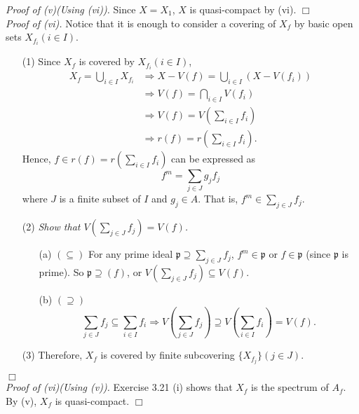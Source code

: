 \documentclass{article}
\begin{document}
\emph{Proof of (v)(Using (vi)).}
Since $X = X_1$, $X$ is quasi-compact by (vi).
$\Box$ \\



\emph{Proof of (vi).}
Notice that it is enough to consider a covering of $X_f$
by basic open sets $X_{f_i} (i \in I)$.
\begin{enumerate}
\item[(1)]
Since $X_f$ is covered by $X_{f_i} (i \in I)$,
\begin{align*}
X_f = \bigcup_{i \in I} X_{f_i}
&\Longrightarrow X - V(f) = \bigcup_{i \in I} (X - V(f_i)) \\
&\Longrightarrow V(f) = \bigcap_{i \in I} V(f_i) \\
&\Longrightarrow V(f) = V\left( \sum_{i \in I} f_i \right) \\
&\Longrightarrow r(f) = r\left( \sum_{i \in I} f_i \right).
\end{align*}
Hence, $f \in r(f) = r\left( \sum_{i \in I} f_i \right)$ can be expressed as
$$f^m = \sum_{j \in J} g_j f_j$$
where $J$ is a finite subset of $I$ and $g_j \in A$.
That is, $f^m \in \sum_{j \in J} f_j$.
\item[(2)]
\emph{Show that $V\left( \sum_{j \in J} f_j \right) = V(f)$.}
\begin{enumerate}
  \item[(a)]
  $(\subseteq)$ For any prime ideal $\mathfrak{p} \supseteq \sum_{j \in J} f_j$,
  $f^m \in \mathfrak{p}$ or $f \in \mathfrak{p}$ (since $\mathfrak{p}$ is prime).
  So $\mathfrak{p} \supseteq (f)$,
  or $V\left( \sum_{j \in J} f_j \right) \subseteq V(f)$.
  \item[(b)]
  $(\supseteq)$
  $$\sum_{j \in J} f_j \subseteq \sum_{i \in I} f_i
  \Longrightarrow
  V\left( \sum_{j \in J} f_j \right) \supseteq V\left( \sum_{i \in I} f_i \right) = V(f).$$
\end{enumerate}
\item[(3)]
Therefore, $X_f$ is covered by finite subcovering $\{X_{f_j}\} (j \in J)$.
\end{enumerate}
$\Box$ \\



\emph{Proof of (vi)(Using (v)).}
Exercise 3.21 (i) shows that $X_f$ is the spectrum of $A_f$.
By (v), $X_f$ is quasi-compact.
$\Box$ \\
\end{document}
